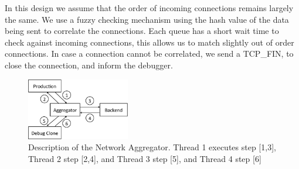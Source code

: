 In this design we assume that the order of incoming connections remains largely the same.
We use a fuzzy checking mechanism using the hash value of the data being sent to correlate the connections. 
Each queue has a short wait time to check against incoming connections, this allows us to match slightly out of order connections.
In case a connection cannot be correlated, we send a TCP\_FIN, to close the connection, and inform the debugger.

\begin{figure}[h]
	\begin{center}
		\includegraphics[width=0.4\textwidth]{figs/aggregator.pdf}
		\caption{Description of the Network Aggregator. Thread 1 executes step [1,3], Thread 2 step [2,4], and Thread 3 step [5], and Thread 4 step [6]}
		\label{fig:aggregator}
	\end{center}
\end{figure}